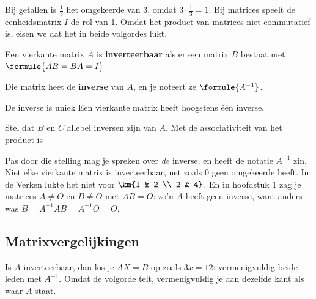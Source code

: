 Bij getallen is $\frac13$ het omgekeerde van 3, omdat $3 \cdot \frac13 = 1$. Bij matrices speelt de eenheidsmatrix $I$ de rol van 1. Omdat het product van matrices niet commutatief is, eisen we dat het in beide volgordes lukt.

\begin{theorie}
Een vierkante matrix $A$ is \textbf{\textcolor{accent}{inverteerbaar}} als er een matrix $B$ bestaat met \quad $\formule{AB = BA = I}$

\vspace{1mm}
Die matrix heet de \textbf{\textcolor{accent}{inverse}} van $A$, en je noteert ze $\formule{A^{-1}}$.

\begin{stelling}{De inverse is uniek}
Een vierkante matrix heeft hoogstens één inverse.
\end{stelling}

\begin{bewijs}
Stel dat $B$ en $C$ allebei inversen zijn van $A$. Met de associativiteit van het product is
\end{bewijs}
\end{theorie}

Pas door die stelling mag je spreken over \textit{de} inverse, en heeft de notatie $A^{-1}$ zin. Niet elke vierkante matrix is inverteerbaar, net zoals 0 geen omgekeerde heeft. In de Verken lukte het niet voor $\km{1 & 2 \\ 2 & 4}$. En in hoofdstuk 1 zag je matrices $A \neq O$ en $B \neq O$ met $AB = O$: zo'n $A$ heeft geen inverse, want anders was $B = A^{-1}AB = A^{-1}O = O$.

\begin{oefeningen}
\end{oefeningen}

\subsection{Matrixvergelijkingen}

Is $A$ inverteerbaar, dan los je $AX = B$ op zoals $3x = 12$: vermenigvuldig beide leden met $A^{-1}$. Omdat de volgorde telt, vermenigvuldig je aan dezelfde kant als waar $A$ staat.

